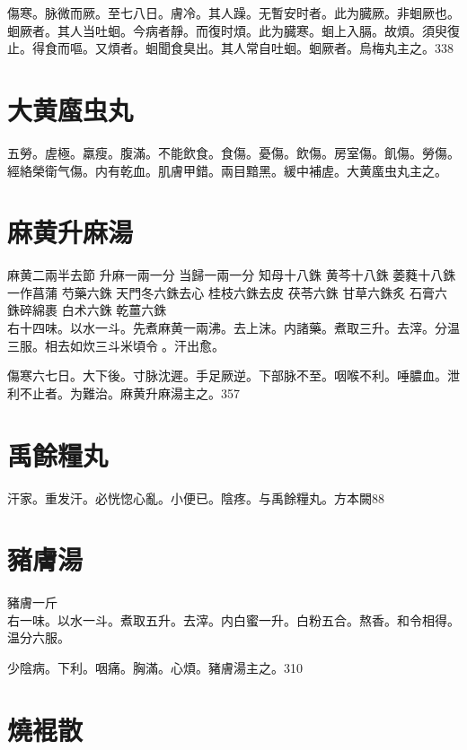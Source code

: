 傷寒。脉微而厥。至七八日。膚冷。其人躁。无暫安时者。此为臓厥。非蛔厥也。蛔厥者。其人当吐蛔。今病者靜。而復时煩。此为臓寒。蛔上入膈。故煩。須臾復止。得食而嘔。又煩者。蛔聞食臭出。其人常自吐蛔。蛔厥者。烏梅丸主之。338

\section{大黄䗪虫丸}

五勞。虗極。羸瘦。腹滿。不能飲食。食傷。憂傷。飲傷。房室傷。飢傷。勞傷。經絡榮衛气傷。内有乾血。肌膚甲錯。兩目黯黑。緩中補虗。大黄䗪虫丸主之。

\section{麻黄升麻湯}

麻黄{\scriptsize 二兩半去節} 升麻{\scriptsize 一兩一分} 当歸{\scriptsize 一兩一分} 知母{\scriptsize 十八銖} 黄芩{\scriptsize 十八銖} 萎蕤{\scriptsize 十八銖一作菖蒲} 芍藥{\scriptsize 六銖} 天門冬{\scriptsize 六銖去心} 桂枝{\scriptsize 六銖去皮} 茯苓{\scriptsize 六銖} 甘草{\scriptsize 六銖炙} 石膏{\scriptsize 六銖碎綿裹} 白术{\scriptsize 六銖} 乾薑{\scriptsize 六銖}\\
右十四味。以水一斗。先煮麻黄一兩沸。去上沫。内諸藥。煮取三升。去滓。分温三服。相去如炊三斗米頃令{\sungtpii 𥁞}。汗出愈。

傷寒六七日。大下後。{\khaaitp 寸}脉沈遲。手足厥逆。下部脉不至。咽喉不利。唾膿血。泄利不止者。为難治。麻黄升麻湯主之。357

\section{禹餘糧丸}

汗家。重发汗。必恍惚心亂。小便已。陰疼。与禹餘糧丸。{\scriptsize 方本闕}88

\section{豬膚湯}

豬膚{\scriptsize 一斤}\\
右一味。以水一斗。煮取五升。去滓。内白蜜一升。白粉五合。熬香。和令相得。温分六服。

少陰病。下利。咽痛。胸滿。心煩。豬膚湯主之。310

\section{燒裩散}

